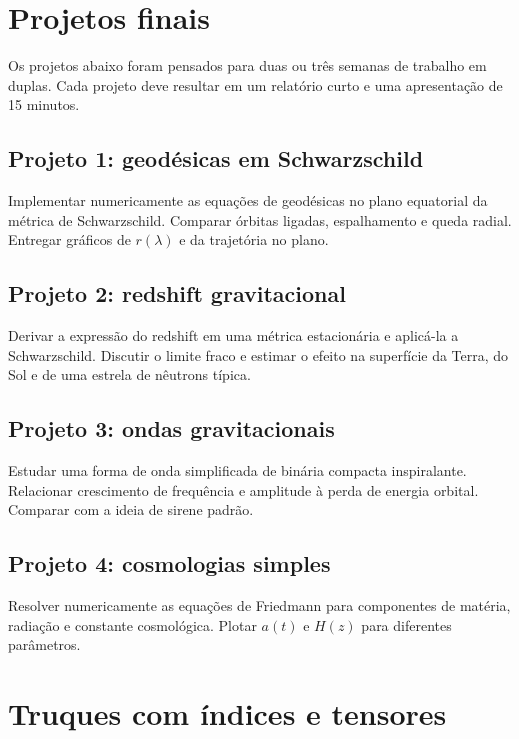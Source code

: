 \documentclass[12pt,a4paper,oneside]{book}
\theoremstyle{rgplain}
\theoremstyle{rgremark}
\begin{document}
\chapter{Projetos finais}

Os projetos abaixo foram pensados para duas ou três semanas de trabalho em
duplas. Cada projeto deve resultar em um relatório curto e uma apresentação de
15 minutos.

\section{Projeto 1: geodésicas em Schwarzschild}

Implementar numericamente as equações de geodésicas no plano equatorial da
métrica de Schwarzschild. Comparar órbitas ligadas, espalhamento e queda radial.
Entregar gráficos de $r(\lambda)$ e da trajetória no plano.

\section{Projeto 2: redshift gravitacional}

Derivar a expressão do redshift em uma métrica estacionária e aplicá-la a
Schwarzschild. Discutir o limite fraco e estimar o efeito na superfície da
Terra, do Sol e de uma estrela de nêutrons típica.

\section{Projeto 3: ondas gravitacionais}

Estudar uma forma de onda simplificada de binária compacta inspiralante.
Relacionar crescimento de frequência e amplitude à perda de energia orbital.
Comparar com a ideia de sirene padrão.

\section{Projeto 4: cosmologias simples}

Resolver numericamente as equações de Friedmann para componentes de matéria,
radiação e constante cosmológica. Plotar $a(t)$ e $H(z)$ para diferentes
parâmetros.

\appendix

\chapter{Truques com índices e tensores}
\label{ap:indices}
\end{document}
